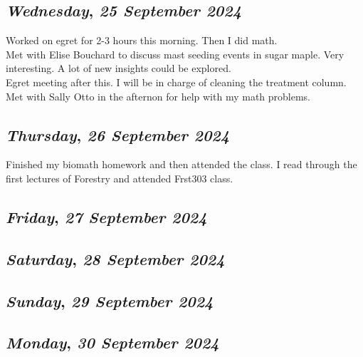 \def\day{\textit{25 September 2024}}
\def\weekday{\textit{Wednesday}}
\subsection*{\weekday, \day}
Worked on egret for 2-3 hours this morning. Then I did math.\\
Met with Elise Bouchard to discuss mast seeding events in sugar maple. Very interesting. A lot of new insights could be explored. \\
Egret meeting after this. I will be in charge of cleaning the treatment column.\\ 
Met with Sally Otto in the afternon for help with my math problems. 

\def\day{\textit{26 September 2024}}
\def\weekday{\textit{Thursday}}
\subsection*{\weekday, \day}
Finished my biomath homework and then attended the class. I read through the first lectures of Forestry and attended Frst303 class. 

\def\day{\textit{27 September 2024}}
\def\weekday{\textit{Friday}}
\subsection*{\weekday, \day}

\def\day{\textit{28 September 2024}}
\def\weekday{\textit{Saturday}}
\subsection*{\weekday, \day}

\def\day{\textit{29 September 2024}}
\def\weekday{\textit{Sunday}}
\subsection*{\weekday, \day}

\def\day{\textit{30 September 2024}}
\def\weekday{\textit{Monday}}
\subsection*{\weekday, \day}